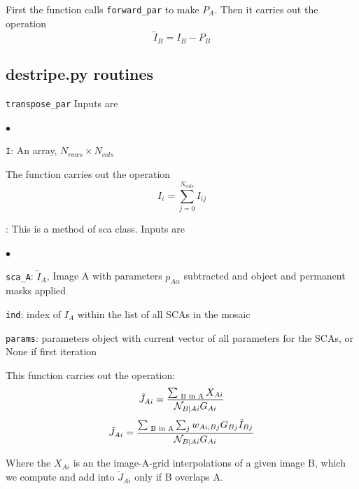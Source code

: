 \documentclass[12pt]{pasj01}
\begin{document}
First the function calls {\tt forward\_par} to make $P_A$. Then it carries out the operation
\begin{equation}
    \tilde{I}_B = I_B - P_B
\end{equation}

\vskip 0.05in


\subsection{destripe.py routines}

{\tt transpose\_par}
 Inputs are
\begin{list}{$\bullet$}{}
\item {\tt I}: An array, $N_{rows}\times N_{cols}$
\end{list}

The function carries out the operation
\begin{equation}
    I_i= \sum_{j=0}^{N_{cols}}I_{ij}
\end{equation}

\vskip 0.05in

: This is a method of sca class. Inputs are
\begin{list}{$\bullet$}{}
\item{\tt sca\_A}: $\tilde{I}_A$, Image A with parameters $p_{A\alpha}$ subtracted and object and permanent masks applied
\item{\tt ind}: index of $I_A$ within the list of all SCAs in the mosaic
\item{\tt params}: parameters object with current vector of all parameters for the SCAs, or None if first iteration
\end{list}
This function carries out the operation: 
\begin{equation}
  \tilde J_{Ai}=\frac{\sum_{\text{ B in A}} X_{Ai}}{{\cal N}_{B|Ai} G_{Ai}}  
\end{equation}
\begin{equation}
  \tilde J_{Ai}=\frac{\sum_{\text{ B in A}} \sum_j w_{Ai;Bj} G_{Bj} \tilde I_{Bj}}{{\cal N}_{B|Ai} G_{Ai}}  
\end{equation}

Where the $X_{Ai}$ is an the image-A-grid interpolations of a given image B, which we compute and add into $\tilde J_{Ai}$ only if B overlaps A.
\end{document}
